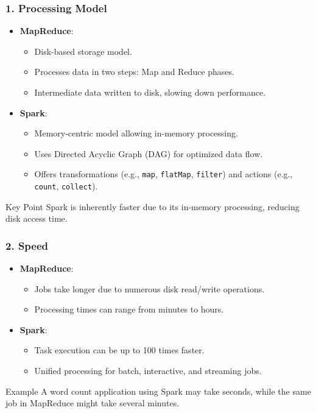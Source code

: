 \documentclass[aspectratio=169]{beamer}
\begin{document}
\begin{frame}[fragile]
    \frametitle{1. Processing Model}
    \begin{itemize}
        \item \textbf{MapReduce}:
            \begin{itemize}
                \item Disk-based storage model.
                \item Processes data in two steps: Map and Reduce phases.
                \item Intermediate data written to disk, slowing down performance.
            \end{itemize}
        \item \textbf{Spark}:
            \begin{itemize}
                \item Memory-centric model allowing in-memory processing.
                \item Uses Directed Acyclic Graph (DAG) for optimized data flow.
                \item Offers transformations (e.g., \texttt{map}, \texttt{flatMap}, \texttt{filter}) and actions (e.g., \texttt{count}, \texttt{collect}).
            \end{itemize}
    \end{itemize}
    \begin{block}{Key Point}
        Spark is inherently faster due to its in-memory processing, reducing disk access time.
    \end{block}
\end{frame}

\begin{frame}[fragile]
    \frametitle{2. Speed}
    \begin{itemize}
        \item \textbf{MapReduce}:
            \begin{itemize}
                \item Jobs take longer due to numerous disk read/write operations.
                \item Processing times can range from minutes to hours.
            \end{itemize}
        \item \textbf{Spark}:
            \begin{itemize}
                \item Task execution can be up to 100 times faster.
                \item Unified processing for batch, interactive, and streaming jobs.
            \end{itemize}
    \end{itemize}
    \begin{block}{Example}
        A word count application using Spark may take seconds, while the same job in MapReduce might take several minutes.
    \end{block}
\end{frame}
\end{document}
